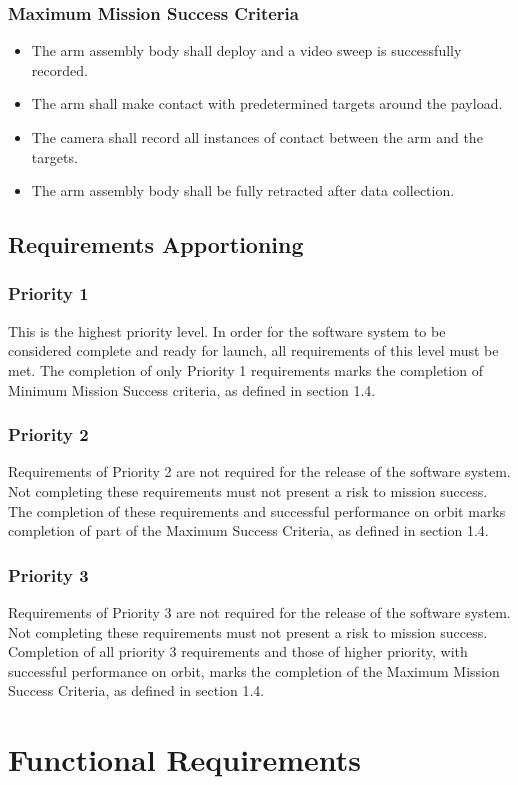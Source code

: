 \documentclass[letterpaper,10pt]{article}
\begin{document}
\subsubsection{Maximum Mission Success Criteria}
\begin{itemize}
\item{The arm assembly body shall deploy and a video sweep is successfully recorded.}
\item{The arm shall make contact with predetermined targets around the payload.}
\item{The camera shall record all instances of contact between the arm and the targets.}
\item{The arm assembly body shall be fully retracted after data collection.}
\end{itemize}
\subsection{Requirements Apportioning}
\subsubsection{Priority 1}
This is the highest priority level. In order for the software system to be considered complete and ready for launch, all requirements of this level must be met.
The completion of only Priority 1 requirements marks the completion of Minimum Mission Success criteria, as defined in section 1.4.
\subsubsection{Priority 2}
Requirements of Priority 2 are not required for the release of the software system.
Not completing these requirements must not present a risk to mission success.
The completion of these requirements and successful performance on orbit marks completion of part of the Maximum Success Criteria, as defined in section 1.4.
\subsubsection{Priority 3}
Requirements of Priority 3 are not required for the release of the software system.
Not completing these requirements must not present a risk to mission success.
Completion of all priority 3 requirements and those of higher priority, with successful performance on orbit, marks the completion of the Maximum Mission Success Criteria, as defined in section 1.4.

\section{Functional Requirements}
\end{document}
